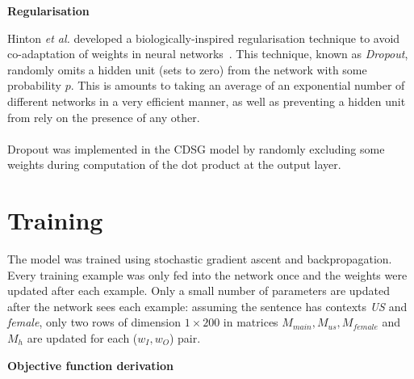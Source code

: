 \documentclass[a4paper,12pt,twoside,openright]{report}
\newcommand{\tb}{\vspace{10pt} \textbf}
\newcommand{\ti}{\textit}
\newcommand{\nl}{\\ \\}
\begin{document}
\tb{Regularisation}

Hinton \ti{et al.} developed a biologically-inspired regularisation technique to avoid co-adaptation of weights in neural networks~\cite{hinton12}. This technique, known as \ti{Dropout}, randomly omits a hidden unit (sets to zero) from the network with some probability $p$. This is amounts to taking an average of an exponential number of different networks in a very efficient manner, as well as preventing a hidden unit from rely on the presence of any other.
\nl
Dropout was implemented in the CDSG model by randomly excluding some weights during computation of the dot product at the output layer.

\section{Training}

The model was trained using stochastic gradient ascent and backpropagation. Every training example was only fed into the network once and the weights were updated after each example. Only a small number of parameters are updated after the network sees each example: assuming the sentence has contexts \ti{US} and \ti{female}, only two rows of dimension $1\times 200$ in matrices $M_{main}, M_{us}, M_{female}$ and $M_{h}$ are updated for each ($w_I, w_O$) pair.

\tb{Objective function derivation}
\end{document}
